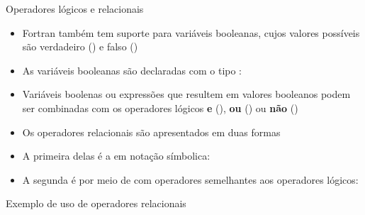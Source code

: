\begin{frame}[fragile]{Operadores lógicos e relacionais}

    \begin{itemize}
        \item Fortran também tem suporte para variáveis booleanas, cujos valores possíveis 
            são verdadeiro () e falso ()

        \item As variáveis booleanas são declaradas com o tipo :


        \item Variáveis boolenas ou expressões que resultem em valores booleanos podem ser 
            combinadas com os operadores lógicos \textbf{e} (), \textbf{ou}
            () ou \textbf{não} ()

        \item Os operadores relacionais são apresentados em duas formas

        \item A primeira delas é a em notação símbolica: 

        \item A segunda é por meio de com operadores semelhantes aos operadores lógicos:
    \end{itemize}

\end{frame}

\begin{frame}[fragile]{Exemplo de uso de operadores relacionais}
\end{frame}
